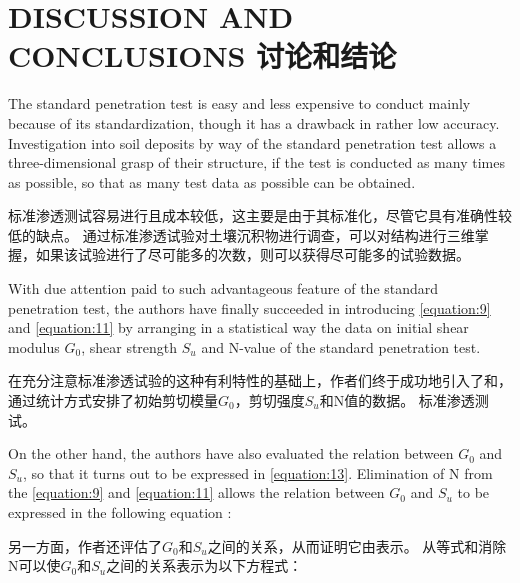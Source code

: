 \section{DISCUSSION AND CONCLUSIONS 讨论和结论}

\begin{paracol}{2}
    
    The standard penetration test is easy and less expensive to conduct mainly because of its standardization, though it has a drawback in rather low accuracy. Investigation into soil deposits by way of the standard penetration test allows a three-dimensional grasp of their structure, if the test is conducted as many times as possible, so that as many test data as possible can be obtained.

    \switchcolumn

    标准渗透测试容易进行且成本较低，这主要是由于其标准化，尽管它具有准确性较低的缺点。 通过标准渗透试验对土壤沉积物进行调查，可以对结构进行三维掌握，如果该试验进行了尽可能多的次数，则可以获得尽可能多的试验数据。  
    
    \switchcolumn*

    With due attention paid to such advantageous feature of the standard penetration test, the authors have finally succeeded in introducing \autoref{equation:9} and \autoref{equation:11} by arranging in a statistical way the data on initial shear modulus $G_0$, shear strength $S_u$ and N-value of the standard penetration test.
    
    \switchcolumn
       
    在充分注意标准渗透试验的这种有利特性的基础上，作者们终于成功地引入了和，通过统计方式安排了初始剪切模量$G_0$，剪切强度$S_u$和N值的数据。 标准渗透测试。      
    \switchcolumn*

    On the other hand, the authors have also evaluated the relation between $G_0$ and $S_u$, so that it turns out to be expressed in \autoref{equation:13}. Elimination of N from the \autoref{equation:9} and \autoref{equation:11} allows the relation between $G_0$ and $S_u$ to be expressed in the following equation :

    \switchcolumn
       
    另一方面，作者还评估了$G_0$和$S_u$之间的关系，从而证明它由表示。 从等式和消除N可以使$G_0$和$S_u$之间的关系表示为以下方程式： 

\end{paracol}


